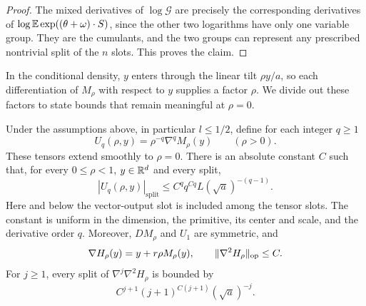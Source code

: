 \begin{proof}
The mixed derivatives of $\log\mathcal G$ are precisely the
corresponding derivatives of
$\log\mathbb E\exp((\theta+\omega)\cdot S)$, since the other two logarithms
have only one variable group.  They are the cumulants, and the two
groups can represent any prescribed nontrivial split of the $n$ slots.
This proves the claim.
\end{proof}

In the conditional density, $y$ enters through the linear tilt
$\rho y/a$, so each differentiation of $M_\rho$ with respect to $y$
supplies a factor $\rho$. We divide out these factors to state bounds
that remain meaningful at $\rho=0$.

\begin{proposition}
\label{prop:gaussian-jets}
Under the assumptions above, in particular $l\le1/2$, define for
each integer $q\ge1$
\[
 U_q(\rho,y)=\rho^{-q}\nabla^q M_\rho(y)\qquad(\rho>0).
\]
These tensors extend smoothly to $\rho=0$. There is an absolute
constant $C$ such that, for every $0\le\rho<1$, $y\in\mathbb R^d$ and
every split,
\begin{equation}
 |U_q(\rho,y)|_{\mathrm{split}}
 \le C^q q^{Cq}L(\sqrt a)^{-(q-1)}.
 \label{eq:jets}
\end{equation}
Here and below the vector-output slot is included among the tensor slots.
The constant is uniform in the dimension, the primitive, its center and
scale, and the derivative order $q$.
Moreover, $DM_\rho$ and $U_1$ are symmetric, and
\begin{equation}
 \nabla H_\rho(y)=y+r\rho M_\rho(y),\qquad
 \|\nabla^2H_\rho\|_{\mathrm{op}}\le C.
 \label{eq:interpolation-score}
\end{equation}
For $j\ge1$, every split of $\nabla^j\nabla^2 H_\rho$ is bounded by
\begin{equation}
 C^{j+1}(j+1)^{C(j+1)}(\sqrt a)^{-j}.
 \label{eq:score-derivatives}
\end{equation}
\end{proposition}

